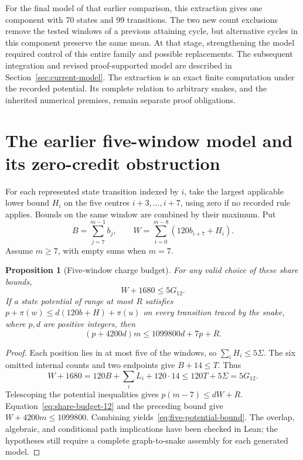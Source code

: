 \documentclass[11pt,a4paper]{article}
\newtheorem{proposition}[theorem]{Proposition}
\theoremstyle{definition}
\theoremstyle{remark}
\begin{document}
For the final model of that earlier comparison, this extraction gives one component with 70 states and 99 transitions. The two new count exclusions remove the tested windows of a previous attaining cycle, but alternative cycles in this component preserve the same mean. At that stage, strengthening the model required control of this entire family and possible replacements. The subsequent integration and revised proof-supported model are described in Section~\ref{sec:current-model}. The extraction is an exact finite computation under the recorded potential. Its complete relation to arbitrary snakes, and the inherited numerical premises, remain separate proof obligations.


\section{The earlier five-window model and its zero-credit obstruction}\label{app:earlier-five-model}\label{sec:current-charge}
For each represented state transition indexed by $i$, take the largest applicable lower bound $H_i$ on the five centres $i+3,\ldots,i+7$, using zero if no recorded rule applies. Bounds on the same window are combined by their maximum. Put
\[
B=\sum_{j=7}^{m-1}b_j,\qquad W=\sum_{i=0}^{m-8}(120b_{i+7}+H_i).
\]
Assume $m\ge7$, with empty sums when $m=7$.

\begin{proposition}[Five-window charge budget]\label{prop:five-budget}
For any valid choice of these share bounds,
\[
W+1680\le5G_{12}.
\]
If a state potential of range at most $R$ satisfies $p+\pi(w)\le d(120b+H)+\pi(u)$ on every transition traced by the snake, where $p,d$ are positive integers, then
\begin{equation}\label{eq:five-potential-bound}
(p+4200d)m\le1099800d+7p+R.
\end{equation}
\end{proposition}
\begin{proof}
Each position lies in at most five of the windows, so $\sum_i H_i\le5\Sigma$. The six omitted internal counts and two endpoints give $B+14\le T$. Thus
\[
W+1680=120B+\sum_iL_i+120\cdot14\le120T+5\Sigma=5G_{12}.
\]
Telescoping the potential inequalities gives $p(m-7)\le dW+R$. Equation~\eqref{eq:share-budget-12} and the preceding bound give $W+4200m\le1099800$. Combining yields~\eqref{eq:five-potential-bound}. The overlap, algebraic, and conditional path implications have been checked in Lean; the hypotheses still require a complete graph-to-snake assembly for each generated model.
\end{proof}
\end{document}
